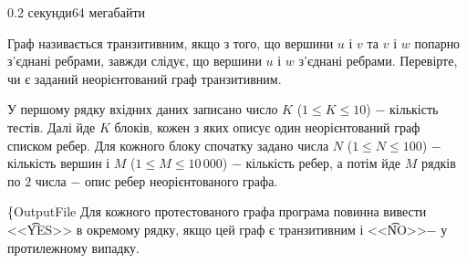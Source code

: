 \begin{problem}{}{}{}{0.2 секунди}{64 мегабайти}

Граф називається транзитивним, якщо з того, що вершини $u$ і $v$ та $v$ і $w$ попарно з'єднані ребрами, завжди слідує, що вершини $u$ і $w$ з'єднані ребрами.
Перевірте, чи є заданий неорієнтований граф транзитивним.

\InputFile
У першому рядку вхідних даних записано число $K$ ($1 \le K \le 10$) $-$ кількість тестів. 
Далі йде $K$ блоків, кожен з яких описує один неорієнтований граф списком ребер. 
Для кожного блоку спочатку задано числа $N$ ($1 \le N \le 100$) $-$ кількість вершин і $M$ ($1 \le M \le 10\,000$) $-$ кількість ребер,
а потім йде $M$ рядків по $2$ числа $-$ опис ребер неорієнтованого графа.

\{OutputFile
Для кожного протестованого графа програма повинна вивести <<{\t{YES}}>> в окремому рядку, якщо цей граф є транзитивним і <<{\t{NO}}>>$-$ у протилежному випадку.

\Example

\begin{example}
%
\end{example}

\end{problem}
